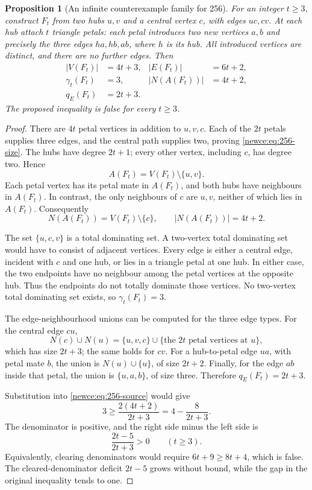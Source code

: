 \documentclass[11pt,a4paper]{article}
\newtheorem{proposition}[theorem]{Proposition}
\theoremstyle{remark}
\begin{document}
\begin{proposition}[An infinite counterexample family for 256]
\label{newce:prop:256}
For an integer $t\ge3$, construct $F_t$ from two hubs $u,v$ and a
central vertex $c$, with edges $uc,cv$.  At each hub attach $t$ triangle
petals: each petal introduces two new vertices $a,b$ and precisely the
three edges $ha,hb,ab$, where $h$ is its hub.  All introduced vertices
are distinct, and there are no further edges.  Then
\begin{align}
|V(F_t)|&=4t+3, & |E(F_t)|&=6t+2,\label{newce:eq:256-size}\\
\gamma_t(F_t)&=3, & |N(A(F_t))|&=4t+2,\label{newce:eq:256-invariants}\\
q_E(F_t)&=2t+3.&&\label{newce:eq:256-q}
\end{align}
The proposed inequality is false for every $t\ge3$.
\end{proposition}

\begin{proof}
There are $4t$ petal vertices in addition to $u,v,c$.  Each of the
$2t$ petals supplies three edges, and the central path supplies two,
proving \eqref{newce:eq:256-size}.
The hubs have degree $2t+1$; every other vertex, including $c$, has
degree two.  Hence
\[
A(F_t)=V(F_t)\setminus\{u,v\}.
\]
Each petal vertex has its petal mate in $A(F_t)$, and both hubs have
neighbours in $A(F_t)$.  In contrast, the only neighbours of $c$ are
$u,v$, neither of which lies in $A(F_t)$.  Consequently
\[
N(A(F_t))=V(F_t)\setminus\{c\},
\qquad |N(A(F_t))|=4t+2.
\]

The set $\{u,c,v\}$ is a total dominating set.  A two-vertex total
dominating set would have to consist of adjacent vertices.  Every
edge is either a central edge, incident with $c$ and one hub, or lies
in a triangle petal at one hub.  In either case, the two endpoints
have no neighbour among the petal vertices at the opposite hub.
Thus the endpoints do not totally dominate those vertices.  No
two-vertex total dominating set exists, so $\gamma_t(F_t)=3$.

The edge-neighbourhood unions can be computed for the three edge
types.  For the central edge $cu$,
\[
N(c)\cup N(u)=\{u,v,c\}\cup
  \{\text{the $2t$ petal vertices at $u$}\},
\]
which has size $2t+3$; the same holds for $cv$.
For a hub-to-petal edge $ua$, with petal mate $b$, the union is
$N(u)\cup\{u\}$, of size $2t+2$.
Finally, for the edge $ab$ inside that petal, the union is
$\{u,a,b\}$, of size three.  Therefore
$q_E(F_t)=2t+3$.

Substitution into \eqref{newce:eq:256-source} would give
\[
3\ge\frac{2(4t+2)}{2t+3}
   =4-\frac8{2t+3}.
\]
The denominator is positive, and the right side minus the left side is
\[
\frac{2t-5}{2t+3}>0\qquad(t\ge3).
\]
Equivalently, clearing denominators would require
$6t+9\ge8t+4$, which is false.  The cleared-denominator deficit
$2t-5$ grows without bound, while the gap in the original inequality
tends to one.
\end{proof}
\end{document}
